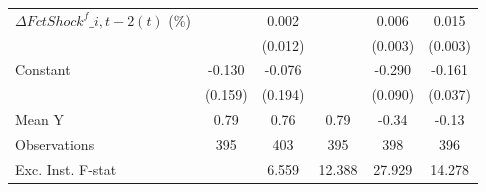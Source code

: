 {\begin{tabular}{l*{5}{c}}
\addlinespace
$ \Delta FctShock^f\_{i,t-2}(t)$ (\%)&                     &       0.002         &                     &       0.006\sym{*}  &       0.015\sym{***}\\
                    &                     &     (0.012)         &                     &     (0.003)         &     (0.003)         \\
\addlinespace
Constant            &      -0.130         &      -0.076         &                     &      -0.290\sym{***}&      -0.161\sym{***}\\
                    &     (0.159)         &     (0.194)         &                     &     (0.090)         &     (0.037)         \\
\midrule
Mean Y              &        0.79         &        0.76         &        0.79         &       -0.34         &       -0.13         \\
Observations        &         395         &         403         &         395         &         398         &         396         \\
Exc. Inst. F-stat   &                     &       6.559         &      12.388         &      27.929         &      14.278         \\
\bottomrule
\end{tabular}
}
